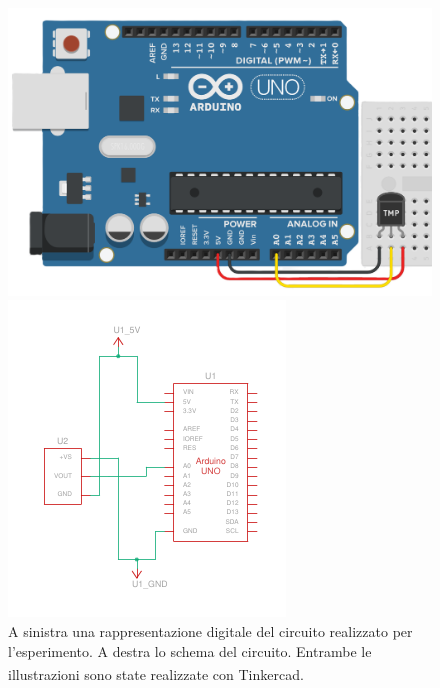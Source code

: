             \begin{figure}[t]
                \centering
                    \begin{minipage}{0.49\textwidth}
                        \includegraphics[width = \textwidth]{images/arduino/temp-pic.png}
                    \end{minipage}
                    \hfill
                    \begin{minipage}{0.49\textwidth}
                        \includegraphics[width = \textwidth]{images/arduino/temp-scheme.pdf}
                    \end{minipage}
                    \caption{A sinistra una rappresentazione digitale del circuito realizzato per l'esperimento. A destra lo schema del circuito. Entrambe le illustrazioni sono state realizzate con Tinkercad\textsuperscript{\tiny\textregistered}.}
                    \label{fig:arduino-1}
            \end{figure}

